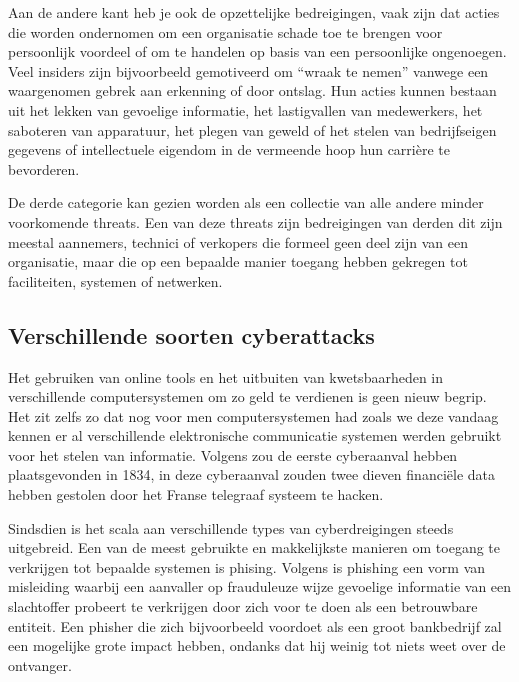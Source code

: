 \vspace{5mm}
Aan de andere kant heb je ook de opzettelijke bedreigingen, vaak zijn dat acties die worden ondernomen om een organisatie schade toe te brengen voor persoonlijk voordeel of om te handelen op basis van een persoonlijke ongenoegen. Veel insiders zijn bijvoorbeeld gemotiveerd om “wraak te nemen” vanwege een waargenomen gebrek aan erkenning of door ontslag. Hun acties kunnen bestaan uit het lekken van gevoelige informatie, het lastigvallen van medewerkers, het saboteren van apparatuur, het plegen van geweld of het stelen van bedrijfseigen gegevens of intellectuele eigendom in de vermeende hoop hun carrière te bevorderen.\autocite{Cisa2025}

\vspace{5mm}
De derde categorie kan gezien worden als een collectie van alle andere minder voorkomende threats. Een van deze threats zijn bedreigingen van derden dit zijn meestal aannemers, technici of verkopers die formeel geen deel zijn van een organisatie, maar die op een bepaalde manier toegang hebben gekregen tot faciliteiten, systemen of netwerken. \autocite{Cisa2025}



\subsection{Verschillende soorten cyberattacks}
Het gebruiken van online tools en het uitbuiten van kwetsbaarheden in verschillende computersystemen om zo geld te verdienen is geen nieuw begrip. Het zit zelfs zo dat nog voor men computersystemen had zoals we deze vandaag kennen er al verschillende elektronische communicatie systemen werden gebruikt voor het stelen van informatie. Volgens \textcite{Monroe2025} zou de eerste cyberaanval hebben plaatsgevonden in 1834, in deze cyberaanval zouden twee dieven financiële data hebben gestolen door het Franse telegraaf systeem te hacken. 

\vspace{5mm}
Sindsdien is het scala aan verschillende types van cyberdreigingen steeds uitgebreid. Een van de meest gebruikte en makkelijkste manieren om toegang te verkrijgen tot bepaalde systemen is phising. Volgens \textcite{jagatic2007} is phishing een vorm van misleiding waarbij een aanvaller op frauduleuze wijze gevoelige informatie van een slachtoffer probeert te verkrijgen door zich voor te doen als een betrouwbare entiteit. Een phisher die zich bijvoorbeeld voordoet als een groot bankbedrijf zal een mogelijke grote impact hebben, ondanks dat hij weinig tot niets weet over de ontvanger. 

